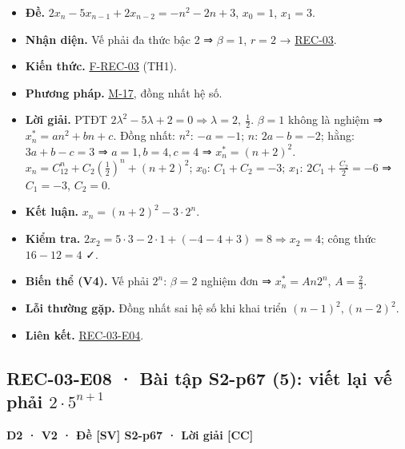 \documentclass[
  10pt,
  twoside,openany]{book}
\providecommand{\tightlist}{%
  \setlength{\itemsep}{0pt}\setlength{\parskip}{0pt}}
\begin{document}
\begin{itemize}
\tightlist
\item
  \textbf{Đề.} \(2x_n-5x_{n-1}+2x_{n-2}=-n^2-2n+3\), \(x_0=1\),
  \(x_1=3\).
\item
  \textbf{Nhận diện.} Vế phải đa thức bậc 2 ⇒ \(\beta=1\), \(r=2\) →
  \protect\hyperlink{REC-03}{REC-03}.
\item
  \textbf{Kiến thức.} \protect\hyperlink{F-REC-03}{F-REC-03} (TH1).
\item
  \textbf{Phương pháp.} \protect\hyperlink{M-17}{M-17}, đồng nhất hệ số.
\item
  \textbf{Lời giải.} PTĐT
  \(2\lambda^2-5\lambda+2=0\Rightarrow\lambda=2,\ \frac12\). \(\beta=1\)
  không là nghiệm ⇒ \(x_n^*=an^2+bn+c\). Đồng nhất: \(n^2\): \(-a=-1\);
  \(n\): \(2a-b=-2\); hằng: \(3a+b-c=3\) ⇒ \(a=1,b=4,c=4\) ⇒
  \(x_n^*=(n+2)^2\). \(x_n=C_12^n+C_2\left(\frac12\right)^n+(n+2)^2\);
  \(x_0\): \(C_1+C_2=-3\); \(x_1\): \(2C_1+\frac{C_2}2=-6\) ⇒
  \(C_1=-3\), \(C_2=0\).
\item
  \textbf{Kết luận.} \(x_n=(n+2)^2-3\cdot2^n\).
\item
  \textbf{Kiểm tra.}
  \(2x_2=5\cdot3-2\cdot1+(-4-4+3)=8\Rightarrow x_2=4\); công thức
  \(16-12=4\) ✓.
\item
  \textbf{Biến thể (V4).} Vế phải \(2^n\): \(\beta=2\) nghiệm đơn ⇒
  \(x_n^*=An2^n\), \(A=\frac23\).
\item
  \textbf{Lỗi thường gặp.} Đồng nhất sai hệ số khi khai triển
  \((n-1)^2,(n-2)^2\).
\item
  \textbf{Liên kết.} \protect\hyperlink{REC-03-E04}{REC-03-E04}.
\end{itemize}

\hypertarget{REC-03-E08}{%
\subsection{\texorpdfstring{REC-03-E08 · Bài tập S2-p67 (5): viết lại vế
phải
\(2\cdot5^{n+1}\)}{REC-03-E08 · Bài tập S2-p67 (5): viết lại vế phải 2\textbackslash cdot5\^{}\{n+1\}}}\label{REC-03-E08}}

\textbf{D2 · V2 · Đề {[}SV{]} S2-p67 · Lời giải {[}CC{]}}
\end{document}
